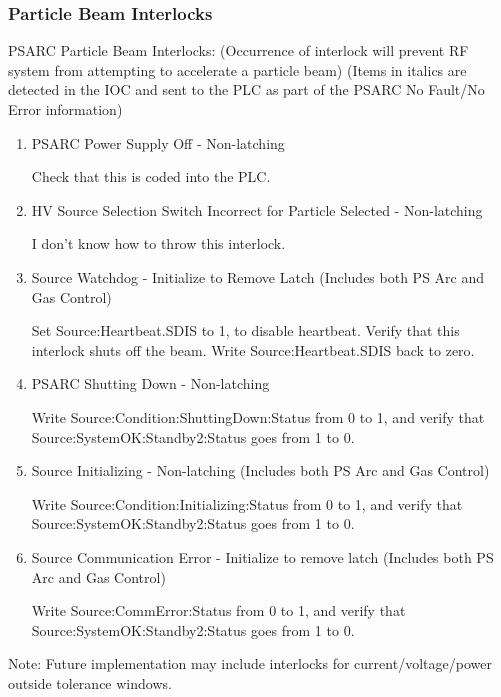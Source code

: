 \documentclass[11pt]{book}		%
\begin{document}
\subsubsection{Particle Beam Interlocks}

PSARC Particle Beam Interlocks:
(Occurrence of interlock will prevent RF system from attempting to accelerate a particle beam)
(Items in italics are detected in the IOC and sent to the PLC as part of the PSARC No Fault/No Error information)

\begin{enumerate}
 \item PSARC Power Supply Off - Non-latching

\color{red}
Check that this is coded into the PLC.
\color{black}

 \item HV Source Selection Switch Incorrect for Particle Selected - Non-latching

\color{red}
I don't know how to throw this interlock.
\color{black}

 \item Source Watchdog - Initialize to Remove Latch (Includes both PS Arc and Gas Control)

\color{red}
Set Source:Heartbeat.SDIS to 1, to disable heartbeat. Verify that this interlock shuts off the beam. Write Source:Heartbeat.SDIS back to zero.
\color{black}

 \item PSARC Shutting Down - Non-latching

\color{red}
Write Source:Condition:ShuttingDown:Status from 0 to 1, and verify that Source:SystemOK:Standby2:Status goes from 1 to 0.
\color{black}

 \item Source Initializing - Non-latching (Includes both PS Arc and Gas Control)

\color{red}
Write Source:Condition:Initializing:Status from 0 to 1, and verify that Source:SystemOK:Standby2:Status goes from 1 to 0.
\color{black}

 \item Source Communication Error - Initialize to remove latch (Includes both PS Arc and Gas Control)

\color{red}
Write Source:CommError:Status from 0 to 1, and verify that Source:SystemOK:Standby2:Status goes from 1 to 0.
\color{black}

\end{enumerate}
Note:  Future implementation may include interlocks for current/voltage/power outside tolerance windows.
\end{document}
